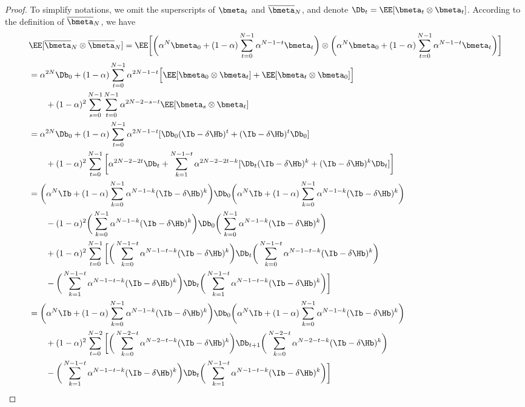 \documentclass[11pt]{article}
\newcommand{\obmeta}{\overline{\bmeta}}
\begin{document}
\begin{proof}
To simplify notations, we omit the superscripts of $\bmeta_t$ and $\obmeta_N$, and denote $\Db_t=\EE[\bmeta_t\otimes\bmeta_t]$. According to the definition of $\obmeta_N$, we have
\begin{align*}
&\EE[\obmeta_N\otimes\obmeta_N]=\EE\bigg[\bigg(\alpha^N\bmeta_0+(1-\alpha)\sum_{t=0}^{N-1}\alpha^{N-1-t}\bmeta_t\bigg)\otimes\bigg(\alpha^N\bmeta_0+(1-\alpha)\sum_{t=0}^{N-1}\alpha^{N-1-t}\bmeta_t\bigg)\bigg]\\
&=\alpha^{2N}\Db_0+(1-\alpha)\sum_{t=0}^{N-1}\alpha^{2N-1-t}\Big[\EE[\bmeta_0\otimes\bmeta_t]+\EE[\bmeta_t\otimes\bmeta_0]\Big]\\
&\qquad+(1-\alpha)^2\sum_{s=0}^{N-1}\sum_{t=0}^{N-1}\alpha^{2N-2-s-t}\EE[\bmeta_s\otimes\bmeta_t]\\
&=\alpha^{2N}\Db_0+(1-\alpha)\sum_{t=0}^{N-1}\alpha^{2N-1-t}[\Db_0(\Ib-\delta\Hb)^t+(\Ib-\delta\Hb)^t\Db_0]\\
&\qquad+(1-\alpha)^2\sum_{t=0}^{N-1}\bigg[\alpha^{2N-2-2t}\Db_t+\sum_{k=1}^{N-1-t}\alpha^{2N-2-2t-k}[\Db_t(\Ib-\delta\Hb)^k+(\Ib-\delta\Hb)^k\Db_t]\bigg]\\
&=\bigg(\alpha^N\Ib+(1-\alpha)\sum_{k=0}^{N-1}\alpha^{N-1-k}(\Ib-\delta\Hb)^k\bigg)\Db_0\bigg(\alpha^N\Ib+(1-\alpha)\sum_{k=0}^{N-1}\alpha^{N-1-k}(\Ib-\delta\Hb)^k\bigg)\\
&\qquad-(1-\alpha)^2\bigg(\sum_{k=0}^{N-1}\alpha^{N-1-k}(\Ib-\delta\Hb)^k\bigg)\Db_0\bigg(\sum_{k=0}^{N-1}\alpha^{N-1-k}(\Ib-\delta\Hb)^k\bigg)\\
&\qquad+(1-\alpha)^2\sum_{t=0}^{N-1}\bigg[\bigg(\sum_{k=0}^{N-1-t}\alpha^{N-1-t-k}(\Ib-\delta\Hb)^k\bigg)\Db_t\bigg(\sum_{k=0}^{N-1-t}\alpha^{N-1-t-k}(\Ib-\delta\Hb)^k\bigg)\\
&\qquad-\bigg(\sum_{k=1}^{N-1-t}\alpha^{N-1-t-k}(\Ib-\delta\Hb)^k\bigg)\Db_t\bigg(\sum_{k=1}^{N-1-t}\alpha^{N-1-t-k}(\Ib-\delta\Hb)^k\bigg)\bigg]\\
&=\bigg(\alpha^N\Ib+(1-\alpha)\sum_{k=0}^{N-1}\alpha^{N-1-k}(\Ib-\delta\Hb)^k\bigg)\Db_0\bigg(\alpha^N\Ib+(1-\alpha)\sum_{k=0}^{N-1}\alpha^{N-1-k}(\Ib-\delta\Hb)^k\bigg)\\
&\qquad+(1-\alpha)^2\sum_{t=0}^{N-2}\bigg[\bigg(\sum_{k=0}^{N-2-t}\alpha^{N-2-t-k}(\Ib-\delta\Hb)^k\bigg)\Db_{t+1}\bigg(\sum_{k=0}^{N-2-t}\alpha^{N-2-t-k}(\Ib-\delta\Hb)^k\bigg)\\
&\qquad-\bigg(\sum_{k=1}^{N-1-t}\alpha^{N-1-t-k}(\Ib-\delta\Hb)^k\bigg)\Db_t\bigg(\sum_{k=1}^{N-1-t}\alpha^{N-1-t-k}(\Ib-\delta\Hb)^k\bigg)\bigg]\\

\end{align*}
\end{proof}
\end{document}
